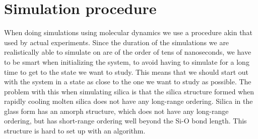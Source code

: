 \chapter{Simulation procedure}
%
%
%
When doing simulations using molecular dynamics we use a procedure akin that used by actual experiments. Since the duration of the simulations we are realistically able to simulate on are of the order of tens of nanoseconds, we have to be smart when initializing the system, to avoid having to simulate for a long time to get to the state we want to study. This means that we should start out with the system in a state as close to the one we want to study as possible. The problem with this when simulating silica is that the silica structure formed when rapidly cooling molten silica does not have any long-range ordering. Silica in the glass form has an amorph structure, which does not have any long-range ordering, but has short-range ordering well beyond the Si-O bond length. This structure is hard to set up with an algorithm.